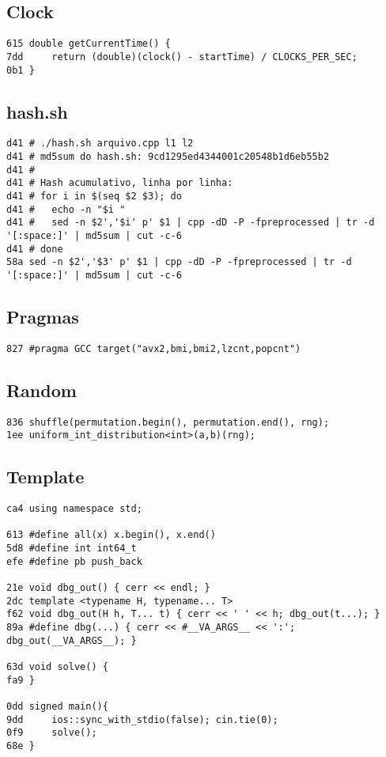 \documentclass[11pt, a4paper, twoside]{article}
\begin{document}
\subsection{Clock}
\begin{lstlisting}
615 double getCurrentTime() {
7dd 	return (double)(clock() - startTime) / CLOCKS_PER_SEC;
0b1 }
\end{lstlisting}

\subsection{hash.sh}
\begin{lstlisting}
d41 # ./hash.sh arquivo.cpp l1 l2
d41 # md5sum do hash.sh: 9cd1295ed4344001c20548b1d6eb55b2
d41 #
d41 # Hash acumulativo, linha por linha:
d41 # for i in $(seq $2 $3); do
d41 #   echo -n "$i "
d41 #   sed -n $2','$i' p' $1 | cpp -dD -P -fpreprocessed | tr -d '[:space:]' | md5sum | cut -c-6
d41 # done
58a sed -n $2','$3' p' $1 | cpp -dD -P -fpreprocessed | tr -d '[:space:]' | md5sum | cut -c-6
\end{lstlisting}

\subsection{Pragmas}
\begin{lstlisting}
827 #pragma GCC target("avx2,bmi,bmi2,lzcnt,popcnt")
\end{lstlisting}

\subsection{Random}
\begin{lstlisting}
836 shuffle(permutation.begin(), permutation.end(), rng);
1ee uniform_int_distribution<int>(a,b)(rng);
\end{lstlisting}

\subsection{Template}
\begin{lstlisting}
ca4 using namespace std;

613 #define all(x) x.begin(), x.end()
5d8 #define int int64_t
efe #define pb push_back

21e void dbg_out() { cerr << endl; }
2dc template <typename H, typename... T>
f62 void dbg_out(H h, T... t) { cerr << ' ' << h; dbg_out(t...); }
89a #define dbg(...) { cerr << #__VA_ARGS__ << ':'; dbg_out(__VA_ARGS__); }

63d void solve() {
fa9 }

0dd signed main(){
9dd 	ios::sync_with_stdio(false); cin.tie(0);
0f9 	solve();
68e }
\end{lstlisting}
\end{document}
